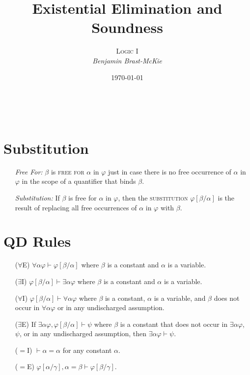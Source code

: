 \documentclass[a4paper, 11pt]{article} %
\title{\textbf{Existential Elimination and Soundness}} %
\author{\textsc{Logic I}\\ \em Benjamin Brast-McKie} %
\date{\today} %
\makeatletter
\newcommand{\unisub}[2]{[#1/#2]}
\renewcommand{\maketitle}{
\begin{flushright}
{\LARGE\@title}

\vspace{10pt}

{\@author}
\\ \@date
\end{flushright}

\vspace{0pt}

}
\makeatother
\begin{document}
\maketitle %

\thispagestyle{empty}



\section*{Substitution}

\begin{enumerate}
  \item[\it Free For:] $\beta$ is \textsc{free for} $\alpha$ in $\varphi$ just in case there is no free occurrence of $\alpha$ in $\varphi$ in the scope of a quantifier that binds $\beta$. 
  \item[\it Substitution:] If $\beta$ is free for $\alpha$ in $\varphi$, then the \textsc{substitution} $\varphi\unisub{\beta}{\alpha}$ is the result of replacing all free occurrences of $\alpha$ in $\varphi$ with $\beta$.
\end{enumerate}
   






\section*{QD Rules}

\begin{enumerate}
  \item[($\forall$E)] $\forall\alpha\varphi \vdash \varphi\unisub{\beta}{\alpha}$ where $\beta$ is a constant and $\alpha$ is a variable. 
  \item[($\exists$I)] $\varphi\unisub{\beta}{\alpha} \vdash \exists\alpha\varphi$ where $\beta$ is a constant and $\alpha$ is a variable.
  \item[($\forall$I)] $\varphi\unisub{\beta}{\alpha} \vdash \forall\alpha\varphi$ where $\beta$ is a constant, $\alpha$ is a variable, and $\beta$ does not occur in $\forall\alpha\varphi$ or in any undischarged assumption.
  \item[($\exists$E)] If $\exists\alpha\varphi,\varphi\unisub{\beta}{\alpha} \vdash \psi$ where $\beta$ is a constant that does not occur in $\exists\alpha\varphi$, $\psi$, or in any undischarged assumption, then $\exists\alpha\varphi\vdash \psi$.
  \item[($=$I)] $\vdash \alpha = \alpha$ for any constant $\alpha$. 
  \item[($=$E)] $\varphi\unisub{\alpha}{\gamma},\alpha=\beta\vdash\varphi\unisub{\beta}{\gamma}$.
\end{enumerate}
\end{document}
